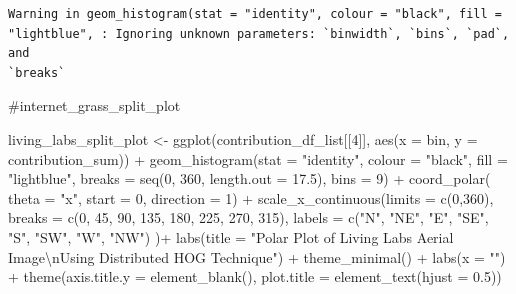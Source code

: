 \documentclass[
  letterpaper,
]{report}
\newenvironment{Shaded}{\begin{snugshade}}{\end{snugshade}}
\newcommand{\AttributeTok}[1]{\textcolor[rgb]{0.40,0.45,0.13}{#1}}
\newcommand{\CommentTok}[1]{\textcolor[rgb]{0.37,0.37,0.37}{#1}}
\newcommand{\DecValTok}[1]{\textcolor[rgb]{0.68,0.00,0.00}{#1}}
\newcommand{\FloatTok}[1]{\textcolor[rgb]{0.68,0.00,0.00}{#1}}
\newcommand{\FunctionTok}[1]{\textcolor[rgb]{0.28,0.35,0.67}{#1}}
\newcommand{\NormalTok}[1]{\textcolor[rgb]{0.00,0.23,0.31}{#1}}
\newcommand{\OtherTok}[1]{\textcolor[rgb]{0.00,0.23,0.31}{#1}}
\newcommand{\SpecialCharTok}[1]{\textcolor[rgb]{0.37,0.37,0.37}{#1}}
\newcommand{\StringTok}[1]{\textcolor[rgb]{0.13,0.47,0.30}{#1}}
\begin{document}
\begin{verbatim}
Warning in geom_histogram(stat = "identity", colour = "black", fill =
"lightblue", : Ignoring unknown parameters: `binwidth`, `bins`, `pad`, and
`breaks`
\end{verbatim}

\begin{Shaded}
\begin{Highlighting}[]
\CommentTok{\#internet\_grass\_split\_plot}
\end{Highlighting}
\end{Shaded}

\begin{Shaded}
\begin{Highlighting}[]
\NormalTok{living\_labs\_split\_plot }\OtherTok{\textless{}{-}}
  \FunctionTok{ggplot}\NormalTok{(contribution\_df\_list[[}\DecValTok{4}\NormalTok{]], }
         \FunctionTok{aes}\NormalTok{(}\AttributeTok{x =}\NormalTok{ bin, }\AttributeTok{y =}\NormalTok{ contribution\_sum)) }\SpecialCharTok{+}
  \FunctionTok{geom\_histogram}\NormalTok{(}\AttributeTok{stat =} \StringTok{"identity"}\NormalTok{,}
                 \AttributeTok{colour =} \StringTok{"black"}\NormalTok{, }
                 \AttributeTok{fill =} \StringTok{"lightblue"}\NormalTok{, }
                 \AttributeTok{breaks =} \FunctionTok{seq}\NormalTok{(}\DecValTok{0}\NormalTok{, }\DecValTok{360}\NormalTok{, }\AttributeTok{length.out =} \FloatTok{17.5}\NormalTok{),}
                 \AttributeTok{bins =} \DecValTok{9}\NormalTok{) }\SpecialCharTok{+}
  \FunctionTok{coord\_polar}\NormalTok{(}
    \AttributeTok{theta =} \StringTok{"x"}\NormalTok{, }
    \AttributeTok{start =} \DecValTok{0}\NormalTok{, }
    \AttributeTok{direction =} \DecValTok{1}\NormalTok{) }\SpecialCharTok{+}
  \FunctionTok{scale\_x\_continuous}\NormalTok{(}\AttributeTok{limits =} \FunctionTok{c}\NormalTok{(}\DecValTok{0}\NormalTok{,}\DecValTok{360}\NormalTok{),}
    \AttributeTok{breaks =} \FunctionTok{c}\NormalTok{(}\DecValTok{0}\NormalTok{, }\DecValTok{45}\NormalTok{, }\DecValTok{90}\NormalTok{, }\DecValTok{135}\NormalTok{, }\DecValTok{180}\NormalTok{, }\DecValTok{225}\NormalTok{, }\DecValTok{270}\NormalTok{, }\DecValTok{315}\NormalTok{), }
    \AttributeTok{labels =} \FunctionTok{c}\NormalTok{(}\StringTok{"N"}\NormalTok{, }\StringTok{"NE"}\NormalTok{, }\StringTok{"E"}\NormalTok{, }\StringTok{"SE"}\NormalTok{, }\StringTok{"S"}\NormalTok{, }\StringTok{"SW"}\NormalTok{, }\StringTok{"W"}\NormalTok{, }\StringTok{"NW"}\NormalTok{)}
\NormalTok{  )}\SpecialCharTok{+}
  \FunctionTok{labs}\NormalTok{(}\AttributeTok{title =} \StringTok{"Polar Plot of Living Labs Aerial Image}\SpecialCharTok{\textbackslash{}n}\StringTok{Using Distributed HOG Technique"}\NormalTok{) }\SpecialCharTok{+}
  \FunctionTok{theme\_minimal}\NormalTok{() }\SpecialCharTok{+}
  \FunctionTok{labs}\NormalTok{(}\AttributeTok{x =} \StringTok{""}\NormalTok{) }\SpecialCharTok{+}
  \FunctionTok{theme}\NormalTok{(}\AttributeTok{axis.title.y =} \FunctionTok{element\_blank}\NormalTok{(),}
        \AttributeTok{plot.title =} \FunctionTok{element\_text}\NormalTok{(}\AttributeTok{hjust =} \FloatTok{0.5}\NormalTok{))}
\end{Highlighting}
\end{Shaded}
\end{document}
